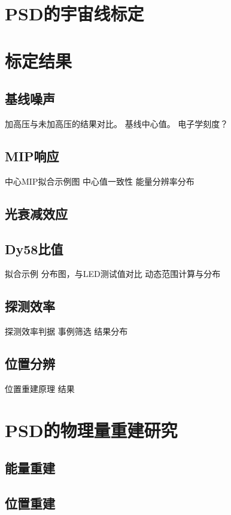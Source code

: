 \section{PSD的宇宙线标定}

\section{标定结果}
\subsection{基线噪声}
加高压与未加高压的结果对比。
基线中心值。
电子学刻度？

\subsection{MIP响应}
中心MIP拟合示例图
中心值一致性
能量分辨率分布

\subsection{光衰减效应}

\subsection{Dy58比值}
拟合示例
分布图，与LED测试值对比
动态范围计算与分布

\subsection{探测效率}
探测效率判据
事例筛选
结果分布

\subsection{位置分辨}
位置重建原理
结果

\section{PSD的物理量重建研究}
\subsection{能量重建}
\subsection{位置重建}